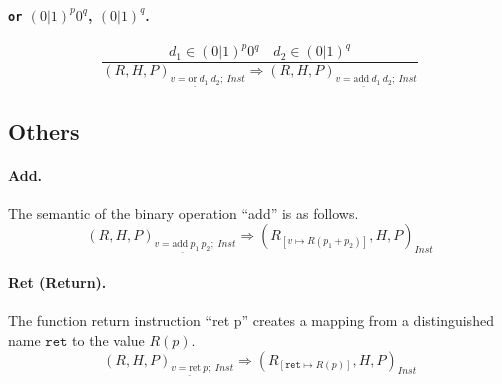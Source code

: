 \paragraph{\texttt{or} $(0|1)^p 0^q$, $(0|1)^q$.}

\[\frac{d_1 \in (0|1)^p 0^q \quad d_2 \in (0|1)^q}
{(R,H,P)_{\underline{v = \text{or}\ d_1\ d_2};\ \mathit{Inst}} \Rightarrow  (R,H,P)_{\underline{v = \text{add}\ d_1\ d_2};\ \mathit{Inst}}}\]

\subsection{Others}

\paragraph{Add.}
The semantic of the binary operation ``add'' is as follows.
\[
(R,H,P)_{\underline{v = \text{add}\ p_1\ p_2};\ \mathit{Inst}} \Rightarrow 
(R_{[v\mapsto R(p_1 + p_2)]},H,P)_\mathit{Inst}
\]

\paragraph{Ret (Return).}
The function return instruction ``ret p'' creates a mapping from a distinguished name \(\texttt{ret}\) to the value $R(p)$.
\[
(R,H,P)_{\underline{v = \text{ret}\ p};\ \mathit{Inst}} \Rightarrow 
(R_{[\texttt{ret}\mapsto R(p)]},H,P)_\mathit{Inst}
\]



